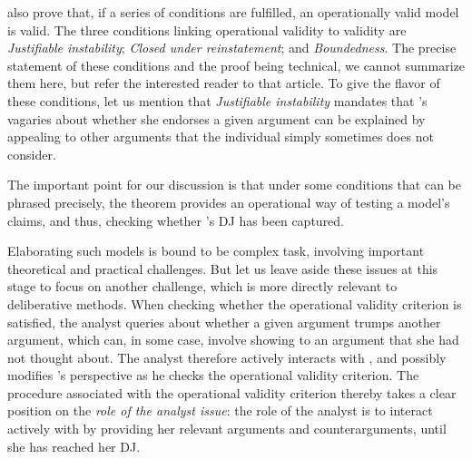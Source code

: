 \documentclass[version=3.21, pagesize, twoside=off, bibliography=totoc, DIV=calc, fontsize=12pt, a4paper, french, english]{scrartcl}
\begin{document}
 also prove that, if a series of conditions are fulfilled, an operationally valid model is valid. The three conditions linking operational validity to validity are \emph{Justifiable instability}; \emph{Closed under reinstatement}; and \emph{Boundedness}. The precise statement of these conditions and the proof being technical, we cannot summarize them here, but refer the interested reader to that article. To give the flavor of these conditions, let us mention that \emph{Justifiable instability} mandates that \thedm’s vagaries about whether she endorses a given argument can be explained by appealing to other arguments that the individual simply sometimes does not consider.%

The important point for our discussion is that under some conditions that can be phrased precisely, the theorem provides an operational way of testing a model’s claims, and thus, checking whether \thedm’s \ac{DJ} has been captured.

Elaborating such models is bound to be complex task, involving important theoretical and practical challenges. But let us leave aside these issues at this stage to focus on another challenge, which is more directly relevant to deliberative methods. 
When checking whether the operational validity criterion is satisfied, the analyst queries \thedm{} about whether a given argument trumps another argument, which can, in some case, involve showing to \thedm{} an argument that she had not thought about. The analyst therefore actively interacts with \thedm, and possibly modifies \thedm’s perspective as he checks the operational validity criterion. 
The procedure associated with the operational validity criterion thereby takes a clear position on the \emph{role of the analyst issue}: the role of the analyst is to interact actively with \thedm{} by providing her relevant arguments and counterarguments, until she has reached her \ac{DJ}.
\end{document}
